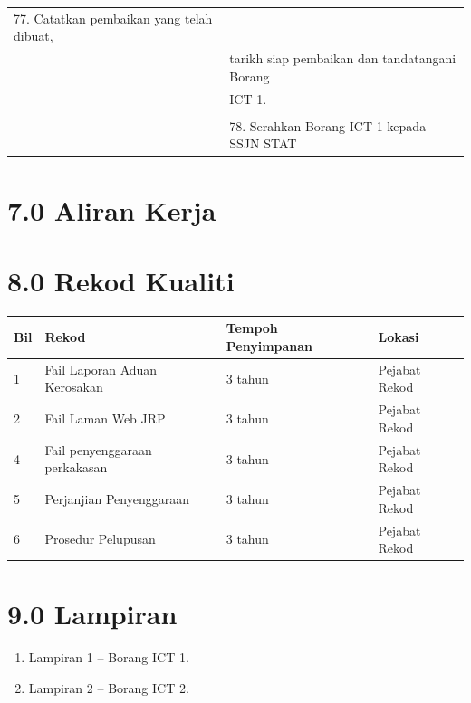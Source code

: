 \documentclass[
]{article}
\begin{document}
\begin{longtable}[]{@{}ll@{}}
\begin{minipage}[t]{0.71\columnwidth}
77. Catatkan pembaikan yang telah dibuat,\strut
\end{minipage}\tabularnewline
\begin{minipage}[t]{0.23\columnwidth}\raggedright
\strut
\end{minipage} & \begin{minipage}[t]{0.71\columnwidth}\raggedright
tarikh siap pembaikan dan tandatangani Borang\strut
\end{minipage}\tabularnewline
\begin{minipage}[t]{0.23\columnwidth}\raggedright
\strut
\end{minipage} & \begin{minipage}[t]{0.71\columnwidth}\raggedright
ICT 1.\strut
\end{minipage}\tabularnewline
\begin{minipage}[t]{0.23\columnwidth}\raggedright
\strut
\end{minipage} & \begin{minipage}[t]{0.71\columnwidth}\raggedright
\strut
\end{minipage}\tabularnewline
\begin{minipage}[t]{0.23\columnwidth}\raggedright
\strut
\end{minipage} & \begin{minipage}[t]{0.71\columnwidth}\raggedright
78. Serahkan Borang ICT 1 kepada SSJN STAT\strut
\end{minipage}\tabularnewline
\bottomrule
\end{longtable}

\hypertarget{aliran-kerja}{%
\section{7.0 Aliran Kerja}\label{aliran-kerja}}

\hypertarget{rekod-kualiti}{%
\section{8.0 Rekod Kualiti}\label{rekod-kualiti}}

\begin{longtable}[]{@{}llll@{}}
\toprule
Bil & Rekod & Tempoh Penyimpanan & Lokasi\tabularnewline
\midrule
\endhead
1 & Fail Laporan Aduan Kerosakan & 3 tahun & Pejabat
Rekod\tabularnewline
2 & Fail Laman Web JRP & 3 tahun & Pejabat Rekod\tabularnewline
4 & Fail penyenggaraan perkakasan & 3 tahun & Pejabat
Rekod\tabularnewline
5 & Perjanjian Penyenggaraan & 3 tahun & Pejabat Rekod\tabularnewline
6 & Prosedur Pelupusan & 3 tahun & Pejabat Rekod\tabularnewline
\bottomrule
\end{longtable}

\hypertarget{lampiran}{%
\section{9.0 Lampiran}\label{lampiran}}

\begin{enumerate}
\def\labelenumi{\roman{enumi})}
\item
  Lampiran 1 -- Borang ICT 1.
\item
  Lampiran 2 -- Borang ICT 2.
\end{enumerate}
\end{document}
